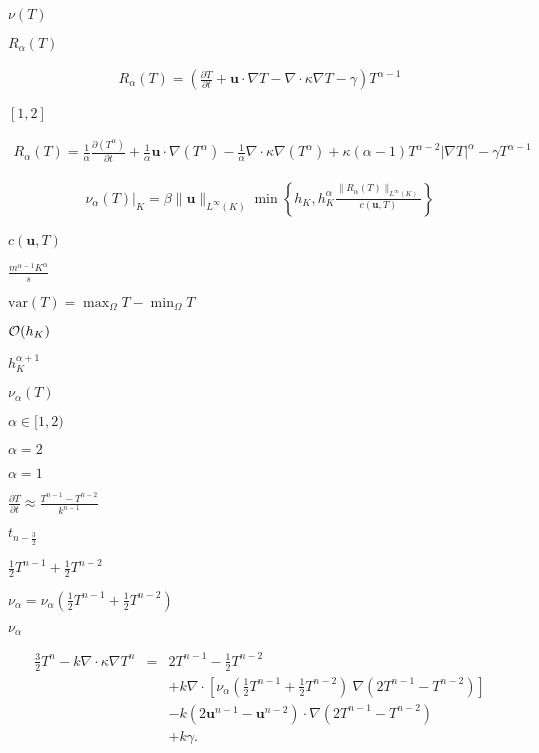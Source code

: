 \documentclass{article}
\begin{document}
$\nu(T)$
\pagebreak

$R_\alpha(T)$
\pagebreak

\begin{eqnarray*} R_\alpha(T) = \left( \frac{\partial T}{\partial t} + {\mathbf u} \cdot \nabla T - \nabla \cdot \kappa \nabla T - \gamma \right) T^{\alpha-1} \end{eqnarray*}
\pagebreak

$[1,2]$
\pagebreak

\begin{eqnarray*} R_\alpha(T) = \frac 1\alpha \frac{\partial (T^\alpha)}{\partial t} + \frac 1\alpha {\mathbf u} \cdot \nabla (T^\alpha) - \frac 1\alpha \nabla \cdot \kappa \nabla (T^\alpha) + \kappa(\alpha-1) T^{\alpha-2} |\nabla T|^\alpha - \gamma T^{\alpha-1} \end{eqnarray*}
\pagebreak

\begin{eqnarray*} \nu_\alpha(T)|_K = \beta \|\mathbf{u}\|_{L^\infty(K)} \min\left\{ h_K, h_K^\alpha \frac{\|R_\alpha(T)\|_{L^\infty(K)}}{c(\mathbf{u},T)} \right\} \end{eqnarray*}
\pagebreak

$c(\mathbf{u},T)$
\pagebreak

$\frac{m^{\alpha-1}K^\alpha}{s}$
\pagebreak

$\mathrm{var}(T)=\max_\Omega T - \min_\Omega T$
\pagebreak

${\cal O}(h_K)$
\pagebreak

$h_K^{\alpha+1}$
\pagebreak

$\nu_\alpha(T)$
\pagebreak

$\alpha\in [1,2)$
\pagebreak

$\alpha=2$
\pagebreak

$\alpha=1$
\pagebreak

$\frac{\partial T}{\partial t} \approx \frac{T^{n-1}-T^{n-2}}{k^{n-1}}$
\pagebreak

$t_{n-\frac{3}{2}}$
\pagebreak

$\frac 12 T^{n-1}+\frac 12 T^{n-2}$
\pagebreak

$\nu_\alpha = \nu_\alpha\left(\frac 12 T^{n-1}+\frac 12 T^{n-2}\right)$
\pagebreak

$\nu_\alpha$
\pagebreak

\begin{eqnarray*} \frac 32 T^n - k\nabla \cdot \kappa \nabla T^n &=& 2 T^{n-1} - \frac 12 T^{n-2} \\ && + k\nabla \cdot \left[ \nu_\alpha\left(\frac 12 T^{n-1}+\frac 12 T^{n-2}\right) \ \nabla (2T^{n-1}-T^{n-2}) \right] \\ && - k(2{\mathbf u}^{n-1}-{\mathbf u}^{n-2}) \cdot \nabla (2T^{n-1}-T^{n-2}) \\ && + k\gamma. \end{eqnarray*}
\pagebreak
\end{document}
